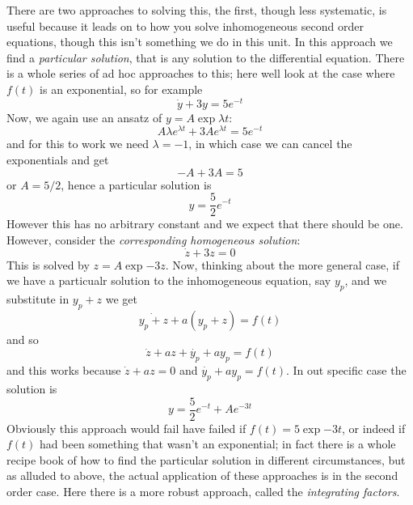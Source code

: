 \documentclass[12pt]{article}
\begin{document}
There are two approaches to solving this, the first, though less
systematic, is useful because it leads on to how you solve
inhomogeneous second order equations, though this isn't something we
do in this unit. In this approach we find a \textsl{particular
  solution}, that is any solution to the differential equation. There
is a whole series of ad hoc approaches to this; here well look at the case where $f(t)$ is an exponential, so for example
\begin{equation}
  \dot{y}+3y=5e^{-t}
\end{equation}
Now, we again use an ansatz of $y=A\exp{\lambda t}$:
\begin{equation}
  A\lambda e^{\lambda t}+3Ae^{\lambda t}=5e^{- t}
\end{equation}
and for this to work we need $\lambda=-1$, in which case we can cancel the exponentials and get
\begin{equation}
  -A+3A=5
\end{equation}
or $A=5/2$, hence a particular solution is
\begin{equation}
  y=\frac{5}{2}e^{-t}
\end{equation}
However this has no arbitrary constant and we expect that there should be one. However, consider the \textsl{corresponding homogeneous solution}:
\begin{equation}
  \dot{z}+3z=0
\end{equation}
This is solved by $z=A\exp{-3z}$. Now, thinking about the more general case, if we have a particualr solution to the inhomogeneous equation, say $y_p$, and we substitute in $y_p+z$ we get
\begin{equation}
  \dot{y_p+z}+a(y_p+z)=f(t)
\end{equation}
and so
\begin{equation}
  \dot{z}+az+\dot{y_p}+ay_p=f(t)
\end{equation}
and this works because $\dot{z}+az=0$ and $\dot{y_p}+ay_p=f(t)$. In out specific case the solution is
\begin{equation}
  y=\frac{5}{2}e^{-t}+Ae^{-3t}
\end{equation}
Obviously this approach would fail have failed if $f(t)=5\exp{-3t}$, or indeed if $f(t)$ had been something that wasn't an exponential; in fact there is a whole recipe book of how to find the particular solution in different circumstances, but as alluded to above, the actual application of these approaches is in the second order case. Here there is a more robust approach, called the \textsl{integrating factors}.
\end{document}
